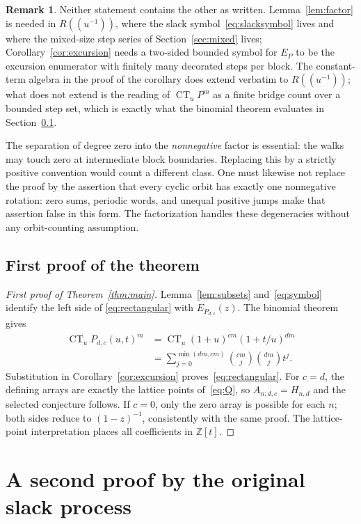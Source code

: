 \documentclass[11pt]{article}
\numberwithin{equation}{section}
\theoremstyle{definition}
\newtheorem{remark}[theorem]{Remark}
\newcommand{\Z}{\mathbb Z}
\newcommand{\CT}{\operatorname{CT}_u}
\newcommand{\Adc}[1]{A_{#1;d,c}}
\begin{document}
\begin{remark}
\label{rem:twoforms}
Neither statement contains the other as written. Lemma~\ref{lem:factor} is
needed in $R((u^{-1}))$, where the slack symbol~\eqref{eq:slacksymbol} lives
and where the mixed-size step series of Section~\ref{sec:mixed} lives;
Corollary~\ref{cor:excursion} needs a two-sided bounded symbol for $E_P$ to be
the excursion enumerator with finitely many decorated steps per block. The
constant-term algebra in the proof of the corollary does extend verbatim to
$R((u^{-1}))$; what does not extend is the reading of $\CT P^m$ as a finite
bridge count over a bounded step set, which is exactly what the binomial
theorem evaluates in Section~\ref{sec:firstproof}.
\end{remark}

The separation of degree zero into the \emph{nonnegative} factor is essential:
the walks may touch zero at intermediate block boundaries. Replacing this by
a strictly positive convention would count a different class. One must
likewise not replace the proof by the assertion that every cyclic orbit has
exactly one nonnegative rotation: zero sums, periodic words, and unequal
positive jumps make that assertion false in this form. The factorization
handles these degeneracies without any orbit-counting assumption.

\subsection{First proof of the theorem}
\label{sec:firstproof}
\begin{proof}[First proof of Theorem~\ref{thm:main}]
Lemma~\ref{lem:subsets} and~\eqref{eq:symbol} identify the left side of
\eqref{eq:rectangular} with $E_{P_{d,c}}(z)$. The binomial theorem gives
\begin{align*}
 \CT P_{d,c}(u,t)^m
 &=\CT(1+u)^{cm}(1+t/u)^{dm}\\
 &=\sum_{j=0}^{\min(dm,cm)}\binom{cm}{j}\binom{dm}{j}t^j.
\end{align*}
Substitution in Corollary~\ref{cor:excursion}
proves~\eqref{eq:rectangular}.
For $c=d$, the defining arrays are exactly the lattice points
of~\eqref{eq:Q}, so $\Adc n=H_{n,d}$ and the selected conjecture follows.
If $c=0$, only the zero array is possible for each $n$; both sides reduce to
$(1-z)^{-1}$, consistently with the same proof. The lattice-point
interpretation places all coefficients in $\Z[t]$.
\end{proof}

\section{A second proof by the original slack process}
\label{sec:slack}
\end{document}

